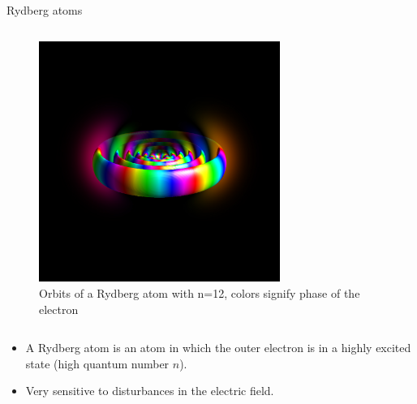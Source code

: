 \begin{columnframe}{Rydberg atoms}
    \begin{column}{0.5\textwidth}
        \begin{figure}
            \centering
            \includegraphics[width=0.7\textwidth, frame]{images/rydberg_atom_colorful.jpg}
            \caption{Orbits of a Rydberg atom with n=12, colors signify phase of the electron}
        \end{figure}
    \end{column}
    \begin{column}{0.5\textwidth}
        \begin{itemize}
            \item A Rydberg atom is an atom in which the outer electron is in a highly excited state (high quantum number $n$).
            \item Very sensitive to disturbances in the electric field.
        \end{itemize}
    \end{column}
\end{columnframe}

